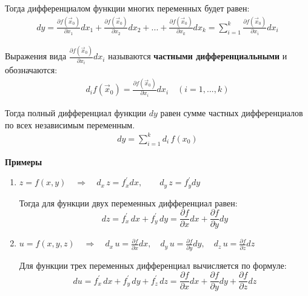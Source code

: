 Тогда дифференциалом функции многих переменных будет равен:
\begin{align*}
	\boxed{d y = \frac{\partial f(\vec{x}_0)}{\partial x_1} d x_1 + \frac{\partial f(\vec{x}_0)}{\partial x_2} d x_2 + ... + \frac{\partial f(\vec{x}_0)}{\partial x_k} d x_k = \sum_{i=1}^{k} \frac{\partial f(\vec{x}_0)}{\partial x_i} d x_i}
\end{align*}

Выражения вида $\frac{\partial f(\vec{x}_0)}{\partial x_i} d x_i$ называются \textbf{частными дифференциальными} и обозначаются:
\begin{align*}
	d_i f(\vec{x}_0) = \frac{\partial f(\vec{x}_0)}{\partial x_i} d x_i \quad (i = 1,...,k)
\end{align*}

Тогда полный дифференциал функции $d y$ равен сумме частных дифференциалов по всех независимым переменным.
\begin{align*}
	d y = \sum_{i=1}^{k} d_i \, f(x_0)
\end{align*}

\begin{center}
	\textbf{Примеры}
\end{center}

\begin{enumerate}
	\item \(z = f(x, y) \quad \Rightarrow \quad d_x \, z = f_x^{\prime} d x, \qquad d_y \, z = f^{\prime}_y d y\)

	Тогда для функции двух переменных дифференциал равен: \\
	\[d z = f^{\prime}_x \, d x + f^{\prime}_y \, d y = \frac{\partial f}{\partial x} d x + \frac{\partial f}{\partial y} d y
	\]
	\item \(u = f(x, y, z) \quad \Rightarrow \quad d_x \, u = \frac{\partial f}{\partial x} d x, \quad d_y \, u = \frac{\partial f}{\partial y} d y, \quad d_z \, u = \frac{\partial f}{\partial z} d z\)

	Для функции трех переменных дифференциал вычисляется по формуле: \\
	\[d u = f^{\prime}_x \, d x + f^{\prime}_y \, d y + f^{\prime}_z \, d z = \frac{\partial f}{\partial x} d x + \frac{\partial f}{\partial y} d y + \frac{\partial f}{\partial z} d z \]
\end{enumerate}

